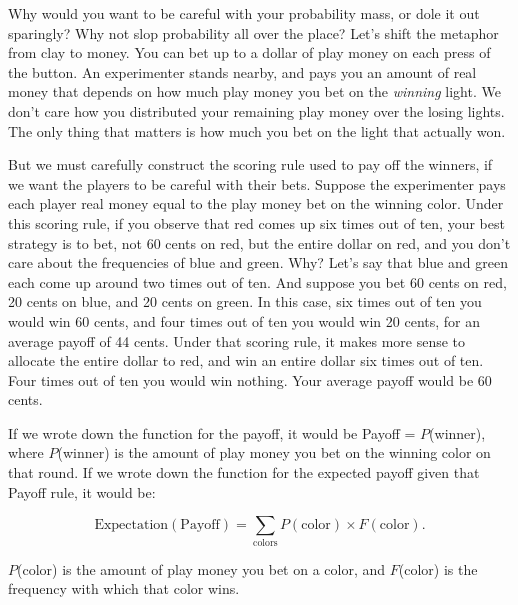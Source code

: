 {
 Why would you want to be careful with your probability mass, or
dole it out sparingly? Why not slop probability all over the place?
Let's shift the metaphor from clay to money. You can
bet up to a dollar of play money on each press of the button. An
experimenter stands nearby, and pays you an amount of real money that
depends on how much play money you bet on the \textit{winning} light.
We don't care how you distributed your remaining play
money over the losing lights. The only thing that matters is how much
you bet on the light that actually won.}

{
 But we must carefully construct the scoring rule used to pay off
the winners, if we want the players to be careful with their bets.
Suppose the experimenter pays each player real money equal to the play
money bet on the winning color. Under this scoring rule, if you observe
that red comes up six times out of ten, your best strategy is to bet,
not 60 cents on red, but the entire dollar on red, and you
don't care about the frequencies of blue and green.
Why? Let's say that blue and green each come up around
two times out of ten. And suppose you bet 60 cents on red, 20 cents on
blue, and 20 cents on green. In this case, six times out of ten you
would win 60 cents, and four times out of ten you would win 20 cents,
for an average payoff of 44 cents. Under that scoring rule, it makes
more sense to allocate the entire dollar to red, and win an entire
dollar six times out of ten. Four times out of ten you would win
nothing. Your average payoff would be 60 cents.}

{
 If we wrote down the function for the payoff, it would be Payoff =
$P$(winner), where $P$(winner) is the amount of play money you bet on the
winning color on that round. If we wrote down the function for the
expected payoff given that Payoff rule, it would be:}

\begin{equation*}
  \text{Expectation}(\text{Payoff}) = \sum_{\text{colors}} P(\text{color})\times F(\text{color}).
\end{equation*}


{
 $P$(color) is the amount of play money you bet on a color, and
$F$(color) is the frequency with which that color wins.}

